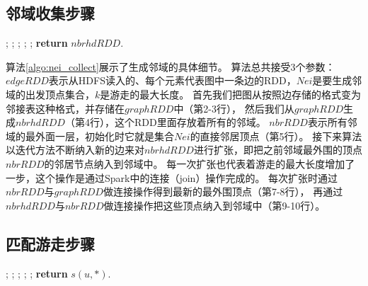 \documentclass[master]{njuthesis}
\begin{document}
\subsection{邻域收集步骤}
\begin{algorithm}[h]
\label{algo:nei_collect}
\begin{algorithmic}[1]
		;
		;
		;
			;
			;
		\EndFor
	\State \textbf{return} $nbrhdRDD$.
	\EndProcedure
\end{algorithmic}
\end{algorithm}
算法\ref{algo:nei_collect}展示了生成邻域的具体细节。
算法总共接受3个参数：$edgeRDD$表示从HDFS读入的、每个元素代表图中一条边的RDD，$Nei$是要生成邻域的出发顶点集合，$k$是游走的最大长度。
首先我们把图从按照边存储的格式变为邻接表这种格式，并存储在$graphRDD$中（第2-3行），
然后我们从$graphRDD$生成$nbrhdRDD$（第4行），这个RDD里面存放着所有的邻域。
$nbrRDD$表示所有邻域的最外面一层，初始化时它就是集合$Nei$的直接邻居顶点（第5行）。
接下来算法以迭代方法不断纳入新的边来对$nbrhdRDD$进行扩张，即把之前邻域最外围的顶点$nbrRDD$的邻居节点纳入到邻域中。
每一次扩张也代表着游走的最大长度增加了一步，这个操作是通过Spark中的连接（join）操作完成的。
每次扩张时通过$nbrRDD$与$graphRDD$做连接操作得到最新的最外围顶点（第7-8行），
再通过$nbrhdRDD$与$nbrRDD$做连接操作把这些顶点纳入到邻域中（第9-10行）。

\subsection{匹配游走步骤}

\begin{algorithm}[t]
\label{algo:match}
\begin{algorithmic}[1]
	;
	;
	;
	;
	\State {\qquad $\})$}
	;
	\State \textbf{return} $s(u, *)$.
\EndProcedure
\end{algorithmic}
\end{algorithm}
\end{document}
